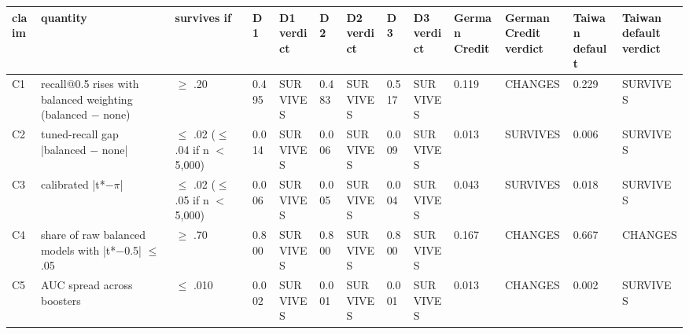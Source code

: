 \begin{tabular}{lp{5.2cm}lllllllllll}
\toprule
claim & quantity & survives if & D1 & D1 verdict & D2 & D2 verdict & D3 & D3 verdict & German Credit & German Credit verdict & Taiwan default & Taiwan default verdict \\
\midrule
C1 & recall@0.5 rises with balanced weighting (balanced $-$ none) & $\geq$ .20 & 0.495 & SURVIVES & 0.483 & SURVIVES & 0.517 & SURVIVES & 0.119 & CHANGES & 0.229 & SURVIVES \\
C2 & tuned-recall gap |balanced $-$ none| & $\leq$ .02 ($\leq$ .04 if n $<$ 5,000) & 0.014 & SURVIVES & 0.006 & SURVIVES & 0.009 & SURVIVES & 0.013 & SURVIVES & 0.006 & SURVIVES \\
C3 & calibrated |t*$-$$\pi$| & $\leq$ .02 ($\leq$ .05 if n $<$ 5,000) & 0.006 & SURVIVES & 0.005 & SURVIVES & 0.004 & SURVIVES & 0.043 & SURVIVES & 0.018 & SURVIVES \\
C4 & share of raw balanced models with |t*$-$0.5| $\leq$ .05 & $\geq$ .70 & 0.800 & SURVIVES & 0.800 & SURVIVES & 0.800 & SURVIVES & 0.167 & CHANGES & 0.667 & CHANGES \\
C5 & AUC spread across boosters & $\leq$ .010 & 0.002 & SURVIVES & 0.001 & SURVIVES & 0.001 & SURVIVES & 0.013 & CHANGES & 0.002 & SURVIVES \\
\bottomrule
\end{tabular}
